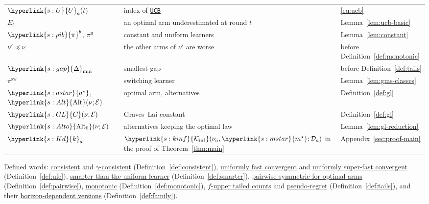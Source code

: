 \documentclass[11pt]{article}
\newcommand{\sy}[2]{{\hyperlink{#1}{#2}}}
\newcommand{\term}[2]{\hyperlink{#1}{#2}}
\newcommand{\Kinf}{\sy{s:kinf}{\mathcal{K}_{\inf}}}
\newcommand{\ms}{\sy{s:mstar}{m^{\star}}}
\newcommand{\gap}{\sy{s:gap}{\Delta}}
\newcommand{\Cons}{\sy{s:pib}{\pi}}
\newcommand{\as}{\sy{s:astar}{a^{\star}}}
\newcommand{\Alt}{\sy{s:Alt}{\mathrm{Alt}}}
\newcommand{\Alto}{\sy{s:Alto}{\mathrm{Alt}_{0}}}
\newcommand{\GL}{\sy{s:GL}{C}}
\newcommand{\Kd}{\sy{s:Kd}{k}}
\newcommand{\Uix}{\sy{s:U}{U}}
\newcommand{\ucb}{\hyperref[alg:ucb]{\texttt{UCB}}}
\begin{document}
\begin{center}
\begin{tabular}{@{}lll@{}}
$\Uix_a(t)$ & index of \ucb{} & \eqref{eq:ucb} \\
$E_t$ & an optimal arm underestimated at round $t$ & Lemma~\ref{lem:ucb-basic} \\
$\Cons^b$, $\pi^{\mathrm{u}}$ & constant and uniform learners & Lemma~\ref{lem:constant} \\
$\nu'\preccurlyeq\nu$ & the other arms of $\nu'$ are worse & before Definition~\ref{def:monotonic} \\
$\gap_{\min}$ & smallest gap & before Definition~\ref{def:tails} \\
$\pi^{\mathrm{sw}}$ & switching learner & Lemma~\ref{lem:gms-classes} \\
$\as$, $\Alt(\nu;\mathcal E)$ & optimal arm, alternatives & Definition~\ref{def:gl} \\
$\GL(\nu;\mathcal E)$ & Graves--Lai constant & Definition~\ref{def:gl} \\
$\Alto(\nu;\mathcal E)$ & alternatives keeping the optimal law & Lemma~\ref{lem:gl-reduction} \\
$\Kd_a$ & $\Kinf(\nu_a,\ms;\mathcal D_a)$ in the proof of Theorem~\ref{thm:main} & Appendix~\ref{sec:proof-main} \\
\bottomrule
\end{tabular}
\end{center}

Defined words: \term{w:cons}{consistent} and \term{w:acons}{$\gamma$-consistent}
(Definition~\ref{def:consistent}), \term{w:ufc}{uniformly fast convergent} and
\term{w:usfc}{uniformly super-fast convergent} (Definition~\ref{def:ufc}),
\term{w:smart}{smarter than the uniform learner} (Definition~\ref{def:smarter}),
\term{w:pairwise}{pairwise symmetric for optimal arms} (Definition~\ref{def:pairwise}),
\term{w:monotonic}{monotonic} (Definition~\ref{def:monotonic}), \term{w:tailT}{$f$-upper tailed
counts} and \term{w:tailR}{pseudo-regret} (Definition~\ref{def:tails}), and their
\term{w:family}{horizon-dependent versions} (Definition~\ref{def:family}).



\end{document}

